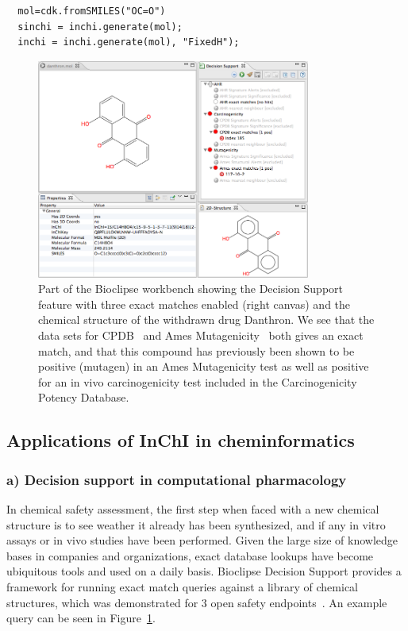 \documentclass[10pt]{bmc_article}
\newenvironment{bmcformat}{\fussy\setboolean{publ}{true}}{\fussy}
\begin{document}
\begin{bmcformat}
\begin{verbatim}
  mol=cdk.fromSMILES("OC=O")
  sinchi = inchi.generate(mol);
  inchi = inchi.generate(mol), "FixedH");
\end{verbatim}


\begin{figure}[!hb]
\begin{center}
	\includegraphics[width=9cm]{danthron-ds.png}

\caption{Part of the Bioclipse workbench showing the Decision Support feature with three exact matches enabled (right canvas) and the chemical structure of the withdrawn drug Danthron. We see that the data sets for CPDB~\cite{Fitzpatrick:2008dp} and Ames Mutagenicity~\cite{Kazius:2005pv} both gives an exact match, and that this compound has previously been shown to be positive (mutagen) in an Ames Mutagenicity test as well as positive for an in vivo carcinogenicity test included in the Carcinogenicity Potency Database.}
\label{fig:danth-ds}
\end{center}
\end{figure}

	



\subsection*{Applications of InChI in cheminformatics}



\subsubsection*{a) Decision support in computational pharmacology}
In chemical safety assessment, the first step when faced with a new chemical structure is to see weather it already has been synthesized, and if any in vitro assays or in vivo studies have been performed. Given the large size of knowledge bases in companies and organizations, exact database lookups have become ubiquitous tools and used on a daily basis. Bioclipse Decision Support provides a framework for running exact match queries against a library of chemical structures, which was demonstrated for 3 open safety endpoints~\cite{Spjuth:2011qf}. An example query can be seen in Figure~\ref{fig:danth-ds}.



\end{bmcformat}
\end{document}
